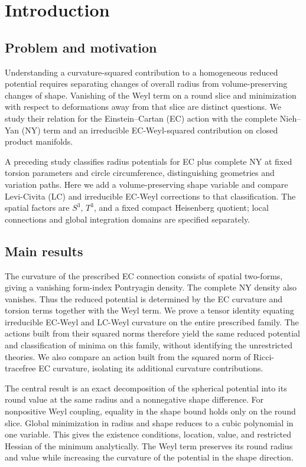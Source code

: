 \section{Introduction}
\label{sec:revised1}

\subsection{Problem and motivation}
Understanding a curvature-squared contribution to a homogeneous reduced
potential requires separating changes of overall radius from
volume-preserving changes of shape. Vanishing of the Weyl term on a round
slice and minimization with respect to deformations away from that slice
are distinct questions. We study their relation for the Einstein--Cartan (EC) action with the complete
Nieh--Yan (NY) term and an irreducible EC-Weyl-squared contribution on closed product manifolds.

A preceding study classifies radius potentials for EC plus complete NY at fixed
torsion parameters and circle circumference, distinguishing geometries and
variation paths.\cite{paper1} Here we add a volume-preserving shape variable
and compare Levi-Civita (LC) and irreducible EC-Weyl corrections to that classification. The spatial
factors are $S^3$, $T^3$, and a fixed compact Heisenberg quotient;
local connections and global integration domains are specified separately.

\subsection{Main results}
The curvature of the prescribed EC connection consists of spatial
two-forms, giving a vanishing form-index Pontryagin density. The complete
NY density also vanishes. Thus the reduced potential is determined by
the EC curvature and torsion terms together with the Weyl term.
We prove a tensor identity equating irreducible EC-Weyl and LC-Weyl
curvature on the entire prescribed family. The actions built from their squared norms therefore yield the same reduced
potential and classification of minima on this family, without identifying the
unrestricted theories. We also compare an action built from the squared norm
of Ricci-tracefree EC curvature, isolating its additional curvature contributions.

The central result is an exact decomposition of the spherical potential
into its round value at the same radius and a nonnegative shape difference.
For nonpositive Weyl coupling, equality in the shape bound holds only
on the round slice. Global minimization in radius and shape reduces to
a cubic polynomial in one variable. This gives the existence conditions,
location, value, and restricted Hessian of the minimum analytically.
The Weyl term preserves its round radius and value while increasing
the curvature of the potential in the shape direction.

